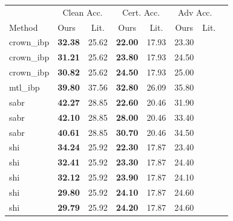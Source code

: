 \begin{tabular}{llcccccc}
\toprule
 & \multicolumn{2}{c}{Clean Acc.} & \multicolumn{2}{c}{Cert. Acc.} & \multicolumn{2}{c}{Adv Acc.} \\
Method & Ours & Lit. & Ours & Lit. & Ours & Lit. \\
\midrule
crown\_ibp & \textbf{32.38} & 25.62 & \textbf{22.00} & 17.93 & 23.30 & \\
crown\_ibp & \textbf{31.21} & 25.62 & \textbf{23.80} & 17.93 & 24.50 & \\
crown\_ibp & \textbf{30.82} & 25.62 & \textbf{24.50} & 17.93 & 25.00 & \\
mtl\_ibp & \textbf{39.80} & 37.56 & \textbf{32.80} & 26.09 & 35.80 & \\
sabr & \textbf{42.27} & 28.85 & \textbf{22.60} & 20.46 & 31.90 & \\
sabr & \textbf{42.10} & 28.85 & \textbf{28.00} & 20.46 & 33.40 & \\
sabr & \textbf{40.61} & 28.85 & \textbf{30.70} & 20.46 & 34.50 & \\
shi & \textbf{34.24} & 25.92 & \textbf{22.30} & 17.87 & 23.40 & \\
shi & \textbf{32.41} & 25.92 & \textbf{23.30} & 17.87 & 24.40 & \\
shi & \textbf{32.12} & 25.92 & \textbf{23.90} & 17.87 & 24.10 & \\
shi & \textbf{29.80} & 25.92 & \textbf{24.10} & 17.87 & 24.60 & \\
shi & \textbf{29.79} & 25.92 & \textbf{24.20} & 17.87 & 24.60 & \\
\bottomrule
\end{tabular}